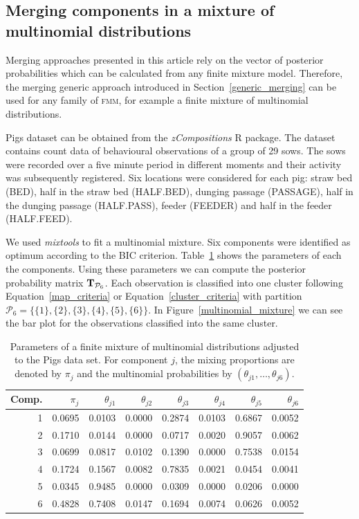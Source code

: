 \documentclass[submit]{smj}
\theoremstyle{definition}
\newcommand{\fmm}{\textsc{fmm}\xspace}
\begin{document}
\subsection{Merging components in a mixture of multinomial distributions}\label{multinom_example}

Merging approaches presented in this article rely on the vector of posterior probabilities which can be calculated from any finite mixture model. Therefore, the merging generic approach introduced in Section~\ref{generic_merging} can be used for any family of \fmm, for example a finite mixture of multinomial distributions.

Pigs dataset can be obtained from the \emph{zCompositions}  \citep{palarea2015zcompositions} R package. The dataset contains count data of behavioural observations of a group of 29 sows. The sows were recorded over a five minute period in different moments and their activity was subsequently registered. Six locations were considered for each pig: straw bed (BED), half in the straw bed (HALF.BED), dunging passage (PASSAGE), half in the dunging passage (HALF.PASS), feeder (FEEDER) and half in the feeder (HALF.FEED).

We used \emph{mixtools} \citep{benaglia2009mixtools} to fit a multinomial mixture. Six components were identified as optimum according to the BIC criterion. Table~\ref{multinomial_pars} shows the parameters of each the components. Using these parameters we can compute the posterior probability matrix $\text{\textbf{T}}_{\mathcal{P}_6}$. Each observation is classified into one cluster following Equation~\ref{map_criteria} or Equation~\ref{cluster_criteria} with partition $\mathcal{P}_6 = \{\{1\}, \{2\}, \{3\}, \{4\}, \{5\}, \{6\}\}$. In Figure~\ref{multinomial_mixture} we can see the bar plot for the observations classified into the same cluster.

\begin{table}[hpdb]
\caption{Parameters of a finite mixture of multinomial distributions adjusted to the Pigs data set. For component $j$, the mixing proportions are denoted by $\pi_j$ and the multinomial probabilities by $\left(\theta_{j1}, \dots, \theta_{j6}\right)$.}
\centering
\begin{tabular}{rrrrrrrr}
  \hline
 Comp.& $\pi_j$ & $\theta_{j1}$ & $\theta_{j2}$ & $\theta_{j3}$ & $\theta_{j4}$ & $\theta_{j5}$ & $\theta_{j6}$ \\ 
  \hline
  1 & 0.0695 & 0.0103 & 0.0000 & 0.2874 & 0.0103 & 0.6867 & 0.0052 \\ 
  2 & 0.1710 & 0.0144 & 0.0000 & 0.0717 & 0.0020 & 0.9057 & 0.0062 \\ 
  3 & 0.0699 & 0.0817 & 0.0102 & 0.1390 & 0.0000 & 0.7538 & 0.0154 \\ 
  4 & 0.1724 & 0.1567 & 0.0082 & 0.7835 & 0.0021 & 0.0454 & 0.0041 \\ 
  5 & 0.0345 & 0.9485 & 0.0000 & 0.0309 & 0.0000 & 0.0206 & 0.0000 \\ 
  6 & 0.4828 & 0.7408 & 0.0147 & 0.1694 & 0.0074 & 0.0626 & 0.0052 \\  
   \hline
\end{tabular}
\label{multinomial_pars}
\end{table}
\end{document}
